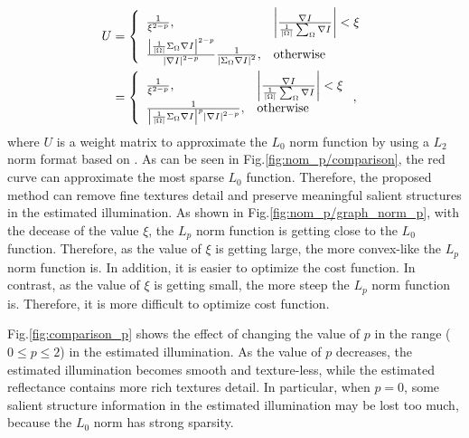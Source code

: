 \begin{align}
U &= \left \{
	\begin{array}{ll}
	\frac{1}{\xi^{2-p}}, 
	& \left |\frac{\nabla{I}}{\frac{1}{|\Omega|} \sum_{\Omega} \nabla{I} } \right| < \xi\\
	\frac{\left |\frac{1}{|\Omega|} \Sigma_{\Omega} \nabla{I} \right|^{2-p}}{\left |\nabla{I} \right|^{2-p}} \frac{1}{\left |\Sigma_{\Omega} \nabla{I} \right|^{2}},
	& \rm{otherwise}
	\end{array} \notag
\right.\\ 
  &= \left \{
  	\begin{array}{ll}
  	\frac{1}{\xi^{2-p}}, 
  	& \left |\frac{\nabla{I}}{\frac{1}{|\Omega|} \sum_{\Omega} \nabla{I} } \right| < \xi\\
  	\frac{1}{\left |\frac{1}{|\Omega|}\Sigma_{\Omega} \nabla{I} \right|^{p} \left |\nabla{I} \right|^{2-p}},
  	& \rm{otherwise}
  	\end{array}
\right. , \label{eq:lp_shape}
\end{align}
where $U$ is a weight matrix to approximate the $L_{0} $ norm function by using a $L_{2}$ norm format based on \cite{l0-sparse}. As can be seen in Fig.\ref{fig:nom_p/comparison}, the red curve can approximate the most sparse $L_{0}$ function. Therefore, the proposed method can remove fine textures detail and preserve meaningful salient structures in the estimated illumination. As shown in Fig.\ref{fig:nom_p/graph_norm_p}, with the decease of the value $\xi$, the $L_{p}$ norm function is getting close to the $L_{0}$ function. Therefore, as the value of $\xi$ is getting large, the more convex-like the $L_{p}$ norm function is. In addition, it is easier to optimize the cost function. In contrast, as the value of $\xi$ is getting small, the more steep the $L_{p}$ norm function is. Therefore, it is more difficult to optimize cost function.\par
Fig.\ref{fig:comparison_p} shows the effect of changing the value of $p$ in the range ($0 \leq p \leq 2$) in the estimated illumination. As the value of $p$ decreases, the estimated illumination becomes smooth and texture-less, while the estimated reflectance contains more rich textures detail. In particular, when $p=0$, some salient structure information in the estimated illumination may be lost too much, because the $L_{0}$ norm has strong sparsity. 
